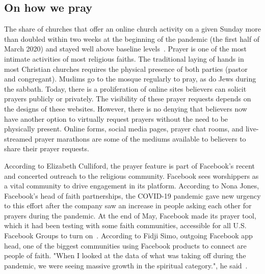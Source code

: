 \subsection{On how we pray}
The share of churches that offer an online church activity on a given Sunday more than doubled within two weeks at the beginning of the pandemic (the first half of March 2020) and stayed well above baseline levels~\cite{Raiber}. Prayer is one of the most intimate activities of most religious faiths. The traditional laying of hands in most Christian churches requires the physical presence of both parties (pastor and congregant). Muslims go to the mosque regularly to pray, as do Jews during the sabbath. Today, there is a proliferation of online sites believers can solicit prayers publicly or privately. The visibility of these prayer requests depends on the designs of these websites. However, there is no denying that believers now have another option to virtually request prayers without the need to be physically present. Online forms, social media pages, prayer chat rooms, and live-streamed prayer marathons are some of the mediums available to believers to share their prayer requests.

According to Elizabeth Culliford, the prayer feature is part of Facebook's recent and concerted outreach to the religious community. Facebook sees worshippers as a vital community to drive engagement in its platform. According to Nona Jones, Facebook's head of faith partnerships, the COVID-19 pandemic gave new urgency to this effort after the company saw an increase in people asking each other for prayers during the pandemic. At the end of May, Facebook made its prayer tool, which it had been testing with some faith communities, accessible for all U.S. Facebook Groups to turn on~\cite{Culliford}. According to Fidji Simo, outgoing Facebook app head, one of the biggest communities using Facebook products to connect are people of faith. "When I looked at the data of what was taking off during the pandemic, we were seeing massive growth in the spiritual category.", he said~\cite{Culliford}.

